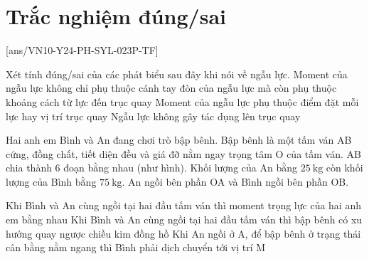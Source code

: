 \section{Trắc nghiệm đúng/sai}
\setcounter{ex}{0}
[ans/VN10-Y24-PH-SYL-023P-TF]
\begin{ex}
	Xét tính đúng/sai của các phát biểu sau đây khi nói về ngẫu lực.
	{Moment của ngẫu lực không chỉ phụ thuộc cánh tay đòn của ngẫu lực mà còn phụ thuộc khoảng cách từ lực đến trục quay}
	{Moment của ngẫu lực phụ thuộc điểm đặt mỗi lực hay vị trí trục quay}
	{\True Ngẫu lực không gây tác dụng lên trục quay}
\end{ex}
\begin{ex}
	Hai anh em Bình và An đang chơi trò bập bênh. Bập bênh là một tấm ván AB cứng, đồng chất, tiết diện đều và giá đỡ nằm ngay trọng tâm O của tấm ván. AB chia thành 6 đoạn bằng nhau (như hình). Khối lượng của An bằng $\SI{25}{\kilogram}$ còn khối lượng của Bình bằng $\SI{75}{\kilogram}$. An ngồi bên phần OA và Bình ngồi bên phần OB.
	\begin{center}
	\end{center}
	{Khi Bình và An cùng ngồi tại hai đầu tấm ván thì moment trọng lực của hai anh em bằng nhau }
	{Khi Bình và An cùng ngồi tại hai đầu tấm ván thì bập bênh có xu hướng quay ngược chiều kim đồng hồ}
	{\True Khi An ngồi ở A, để bập bênh ở trạng thái cân bằng nằm ngang thì Bình phải dịch chuyển tới vị trí M}
\end{ex}
